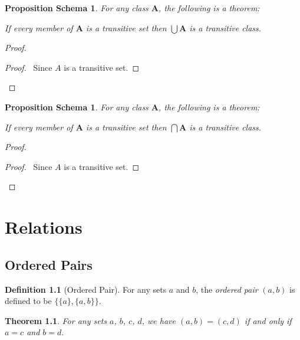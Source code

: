 \documentclass{book}
\let\qed\relax
\newtheorem{props}[ax]{Proposition Schema}
\newtheorem{thm}[ax]{Theorem}
\theoremstyle{definition}
\newtheorem{df}[ax]{Definition}
\begin{document}
\begin{props}
For any class $\mathbf{A}$, the following is a theorem:

If every member of $\mathbf{A}$ is a transitive set then $\bigcup \mathbf{A}$ is a transitive class.
\end{props}

\begin{proof}
\pf
{}
\begin{proof}
	\pf\ Since $A$ is a transitive set.
\end{proof}
\qed
\end{proof}

\begin{props}
For any class $\mathbf{A}$, the following is a theorem:

If every member of $\mathbf{A}$ is a transitive set then $\bigcap \mathbf{A}$ is a transitive class.
\end{props}

\begin{proof}
\pf
{}
\begin{proof}
	\pf\ Since $A$ is a transitive set.
\end{proof}
\qed
\end{proof}

\chapter{Relations}

\section{Ordered Pairs}

\begin{df}[Ordered Pair]
For any sets $a$ and $b$, the \emph{ordered pair} $(a,b)$ is defined to be $\{ \{ a \}, \{a , b \} \}$.
\end{df}

\begin{thm}
For any sets $a$, $b$, $c$, $d$, we have $(a,b) = (c,d)$ if and only if $a = c$ and $b = d$.
\end{thm}
\end{document}
